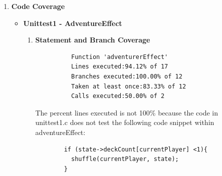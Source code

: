 \documentclass[11pt,letterpaper]{article}
\begin{document}
\begin{enumerate}[label=\Roman*.]
\begin{enumerate}
\begin{itemize}[leftmargin=*]
\begin{lstlisting}
  int k[10] = {adventurer, embargo, village, minion, mine, cutpurse, sea_hag, tribute, smithy, council_room};
  initializeGame(numPlayers, k, seed, &G);
  setHand(&G, player, handpos); // sets hand to have four coppers and Mine
  choice0 = 0;                  // will be trashing first copper
  choice1 = village;             // NOT ALLOWED
  memcpy(&testG, &G, sizeof(struct gameState)); 
  
  // TEST STARTS HERE
  result = cardEffect(mine, choice0, choice1, 0, &testG, handpos, &coin_bonus);
  if (result == -1)
    printf("\tPASSED: Function returned -1 (not allowed to trash non-treasure)\n");
  else printf("\t\u274CFAILED: Function did not return -1, so it continued unexpectedly\n");
          \end{lstlisting}
        \end{itemize}
    \end{enumerate}

  \item \textbf{Code Coverage}
    
    \begin{itemize}[leftmargin=*]
      \item \textbf{Unittest1 - AdventureEffect}
      
        \begin{enumerate}[leftmargin=*]
          \item \textbf{Statement and Branch Coverage}

          \begin{lstlisting}
          Function 'adventurerEffect'
          Lines executed:94.12% of 17
          Branches executed:100.00% of 12
          Taken at least once:83.33% of 12
          Calls executed:50.00% of 2
          \end{lstlisting}

          The percent lines executed is not 100\% because the code in unittest1.c
          does not test the following code snippet within adventureEffect:

          \begin{lstlisting}
        if (state->deckCount[currentPlayer] <1){
          shuffle(currentPlayer, state);
        }
          \end{lstlisting}


\end{enumerate}
\end{itemize}
\end{enumerate}
\end{document}
